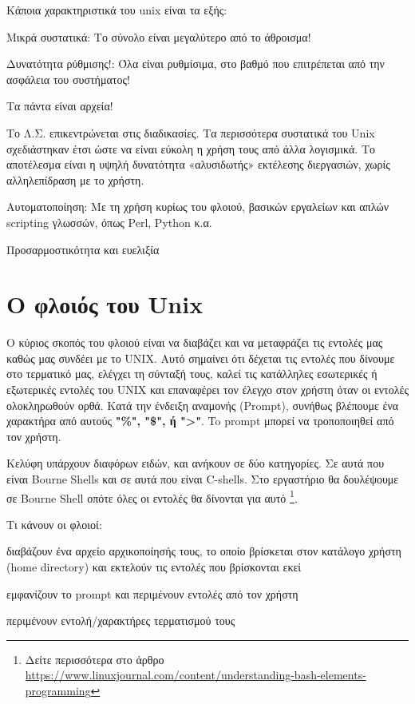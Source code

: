 Κάποια χαρακτηριστικά του unix είναι τα εξής:
\begin{packed_item}
\item Μικρά συστατικά: Το σύνολο είναι μεγαλύτερο από το άθροισμα!
\item Δυνατότητα ρύθμισης!: Όλα είναι ρυθμίσιμα, στο βαθμό που επιτρέπεται από την ασφάλεια του συστήματος!
\item Τα πάντα είναι αρχεία!
\item Το Λ.Σ. επικεντρώνεται στις διαδικασίες. Τα περισσότερα συστατικά του Unix σχεδιάστηκαν έτσι ώστε να είναι εύκολη η χρήση τους από άλλα λογισμικά. Το αποτέλεσμα είναι η υψηλή δυνατότητα «αλυσιδωτής» εκτέλεσης διεργασιών, χωρίς αλληλεπίδραση με το χρήστη.
\item Αυτοματοποίηση: Με τη χρήση κυρίως του φλοιού, βασικών εργαλείων και απλών scripting γλωσσών, όπως Perl, Python κ.α.
\item Προσαρμοστικότητα και ευελιξία
\end{packed_item}



\section{Ο φλοιός του Unix}

Ο κύριος σκοπός του φλοιού είναι να διαβάζει και να μεταφράζει τις εντολές μας καθώς μας συνδέει με το UΝΙΧ. Αυτό σημαίνει ότι δέχεται τις εντολές που δίνουμε στο τερματικό μας, ελέγχει τη σύνταξή τους, καλεί τις κατάλληλες εσωτερικές ή εξωτερικές εντολές του UΝΙΧ και επαναφέρει τον έλεγχο στον χρήστη όταν οι εντολές ολοκληρωθούν ορθά.
Κατά την ένδειξη αναμονής (Prompt), συνήθως βλέπουμε ένα χαρακτήρα από αυτούς \textbf{"\%", "\$", ή ">"}.
To prompt μπορεί να τροποποιηθεί από τον χρήστη.

Κελύφη υπάρχουν διαφόρων ειδών, και ανήκουν σε δύο κατηγορίες. Σε αυτά που είναι Bourne Shells και σε αυτά που είναι C-shells. Στο εργαστήριο θα δουλέψουμε σε Bourne Shell οπότε όλες οι εντολές θα δίνονται για αυτό \footnote{Δείτε περισσότερα στο άρθρο \href{https://www.linuxjournal.com/content/understanding-bash-elements-programming}{https://www.linuxjournal.com/content/understanding-bash-elements-programming}}. 



Τι κάνουν οι φλοιοί:
\begin{packed_enum}
  \item διαβάζουν ένα αρχείο αρχικοποίησής τους, το οποίο βρίσκεται στον κατάλογο χρήστη (home directory) και εκτελούν τις εντολές που βρίσκονται εκεί
  \item εμφανίζουν το prompt και περιμένουν εντολές από τον χρήστη
  \item περιμένουν εντολή/χαρακτήρες τερματισμού τους
\end{packed_enum}

